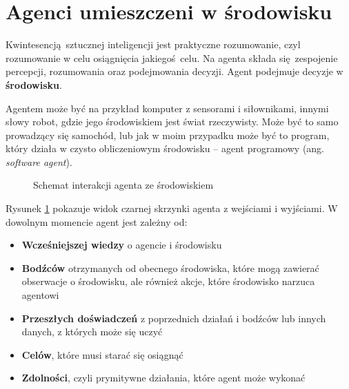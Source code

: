 \documentclass[a4paper,12pt,oneside]{book}
\begin{document}
\section{Agenci umieszczeni w środowisku}
Kwintesencją sztucznej inteligencji jest praktyczne rozumowanie, czyl
rozumowanie w celu osiągnięcia jakiegoś celu. Na agenta składa się zespojenie
percepcji, rozumowania oraz podejmowania decyzji. Agent podejmuje decyzje w
\textbf{środowisku}.

Agentem może być na przykład komputer z sensorami i siłownikami, innymi słowy
robot, gdzie jego środowiskiem jest świat rzeczywisty. Może być to samo
prowadzący się samochód, lub jak w moim przypadku może być to program, który
działa w czysto obliczeniowym środowisku -- agent programowy (ang.
\textit{software agent}).
\begin{figure}[!htb]
\begin{center}
\end{center}
\label{rl_figure}
\caption{Schemat interakcji agenta ze środowiskiem}
\end{figure}

Rysunek \ref{rl_figure} pokazuje widok czarnej skrzynki agenta z wejściami
i wyjściami. W dowolnym momencie agent jest zależny od:
\begin{itemize}
	\setlength\itemsep{-0.4em}
	\item \textbf{Wcześniejszej wiedzy} o agencie i środowisku
	\item \textbf{Bodźców} otrzymanych od obecnego
		środowiska, które mogą zawierać obserwacje o
		środowisku, ale również akcje, które środowisko
		narzuca agentowi
	\item \textbf{Przeszłych doświadczeń} z poprzednich
		działań i bodźców lub innych danych, z których
		może się uczyć
	\item \textbf{Celów}, które musi starać się osiągnąć
	\item \textbf{Zdolności}, czyli prymitywne działania, które agent
		może wykonać
\end{itemize}
\end{document}
